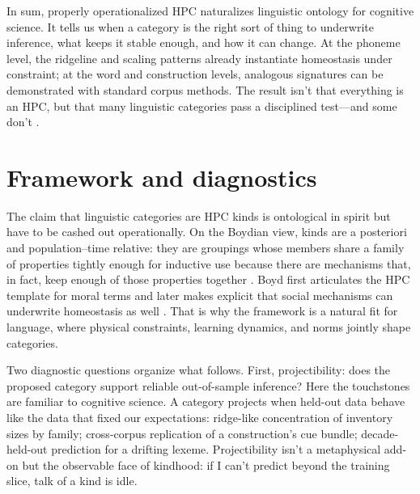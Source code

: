 \documentclass[12pt]{article}
\begin{document}
In sum, properly operationalized HPC naturalizes linguistic ontology for cognitive science. It tells us when a category is the right sort of thing to underwrite inference, what keeps it stable enough, and how it can change. At the phoneme level, the ridgeline and scaling patterns already instantiate homeostasis under constraint; at the word and construction levels, analogous signatures can be demonstrated with standard corpus methods. The result isn't that everything is an HPC, but that many linguistic categories pass a disciplined test---and some don't \citep{Miller2021WordsSpeciesKinds,Ekstrom2025PhonemeTool}.

\section{Framework and diagnostics}\label{sec:framework}

The claim that linguistic categories are HPC kinds is ontological in spirit but have to be cashed out operationally. On the Boydian view, kinds are a posteriori and population–time relative: they are groupings whose members share a family of properties tightly enough for inductive use because there are mechanisms that, in fact, keep enough of those properties together \citep{Boyd1991Enthusiasm,Boyd1999Homeostasis}. Boyd first articulates the \textsc{HPC} template for moral terms \citep[§3.8]{Boyd1988MoralRealist} and later makes explicit that social mechanisms can underwrite homeostasis as well \citep{Boyd2000Workmanship}. That is why the framework is a natural fit for language, where physical constraints, learning dynamics, and norms jointly shape categories.

Two diagnostic questions organize what follows. First, projectibility: does the proposed category support reliable out-of-sample inference? Here the touchstones are familiar to cognitive science. A category projects when held-out data behave like the data that fixed our expectations: ridge-like concentration of inventory sizes by family; cross-corpus replication of a construction’s cue bundle; decade-held-out prediction for a drifting lexeme. Projectibility isn't a metaphysical add-on but the observable face of kindhood: if I can't predict beyond the training slice, talk of a kind is idle.
\end{document}
